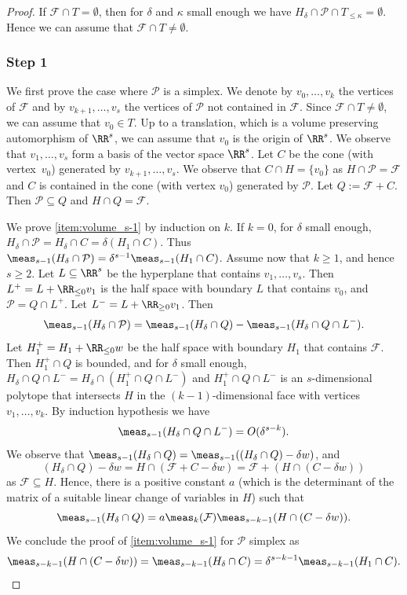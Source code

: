 \begin{proof}
If $\mathcal F\cap T=\emptyset$,
then for $\delta$ and $\kappa$ small enough we have
$H_\delta \cap \mathcal P \cap T_{\leq\kappa}=\emptyset$.
Hence we can assume that $\mathcal F\cap T\neq\emptyset$.

\subsubsection*{Step 1}
We first prove the case where $\mathcal P$ is a simplex.
We denote by $v_0, \dots, v_k$
the vertices of $\mathcal F$ and by $v_{k+1},\dots, v_s$ the vertices of $\mathcal P$
not contained in $\mathcal F$. Since $\mathcal F\cap T\neq\emptyset$, we can assume that $v_0\in T$.
Up to a translation, which is a volume preserving automorphism of $\RR^s$,
we can assume that $v_0$ is the origin of $\RR^s$.
We observe that $v_1,\dots, v_s$ form a basis of the vector space $\RR^s$.
Let $C$ be the cone (with vertex~$v_0$) generated by $v_{k+1},\dots, v_s$.
We observe that $C\cap H=\{v_0\}$ as $H\cap \mathcal P=\mathcal F$ and $C$
is contained in the cone (with vertex $v_0$) generated by $\mathcal P$.
Let $Q:= \mathcal F+ C$. Then $\mathcal P\subseteq Q$ and $H\cap Q=\mathcal F$.

We prove \eqref{item:volume_s-1} by induction on $k$. If $k=0$,
for $\delta$ small enough, $H_\delta\cap\mathcal P=H_\delta\cap C=\delta(H_1\cap C)$.
Thus $\meas_{s-1}(H_\delta\cap\mathcal P)=\delta^{s-1}\meas_{s-1}(H_1\cap C)$.
Assume now that $k\geq 1$, and hence $s\geq 2$.
Let $L\subseteq \RR^s$ be the hyperplane that contains $v_1,\dots,v_s$.
Then $L^+=L+\RR_{\leq 0} v_1$ is the half space with boundary $L$ that contains $v_0$,
and $\mathcal P=Q\cap L^+$. Let $L^-=L+\RR_{\geq 0} v_1$.
Then
\[
\meas_{s-1}(H_\delta\cap\mathcal P)
=\meas_{s-1}(H_\delta\cap Q)-\meas_{s-1}(H_\delta\cap Q\cap L^-).
\]
Let $H_1^+=H_{1}+\RR_{\leq 0}w$ be the half space with boundary $H_1$ that contains $\mathcal F$.
Then $H_1^+\cap Q$ is bounded, and for $\delta$ small enough,
$H_\delta\cap Q\cap L^-=H_\delta\cap (H_1^+\cap Q\cap L^-)$
and $H_1^+\cap Q\cap L^-$ is an $s$-dimensional polytope that intersects $H$
in the $(k-1)$-dimensional face with vertices $v_1,\dots,v_k$.
By induction hypothesis we have
\begin{equation*}
\label{eq:volume:Qcap L^-}
\meas_{s-1}(H_\delta\cap Q\cap L^-)=O(\delta^{s-k}).
\end{equation*}
We observe that $\meas_{s-1}(H_\delta\cap Q)=\meas_{s-1}((H_\delta\cap Q)-\delta w)$, and
\[
(H_\delta\cap Q)-\delta w=H\cap (\mathcal F+C-\delta w)=\mathcal F+(H\cap (C-\delta w))
\]
as $\mathcal F\subseteq H$.
Hence, there is a positive constant $a$ (which is the determinant of the matrix of a
suitable linear change of variables in $H$) such that
\[
\meas_{s-1}(H_\delta\cap Q)=a\meas_k(\mathcal F)\meas_{s-k-1}(H\cap (C-\delta w)).
\]
We conclude the proof of \eqref{item:volume_s-1} for $\mathcal P$ simplex as
\[
\meas_{s-k-1}(H\cap (C-\delta w))
=\meas_{s-k-1}(H_\delta\cap C)=\delta^{s-k-1}\meas_{s-k-1}(H_1\cap C).
\]


\end{proof}
